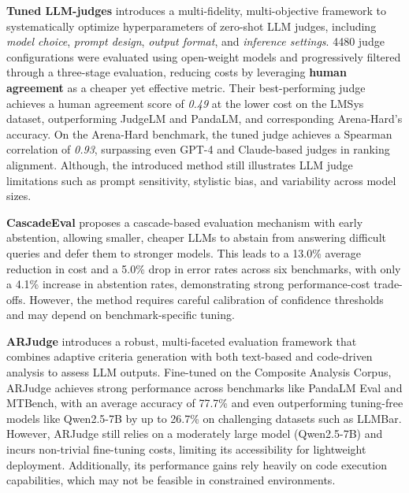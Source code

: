 \documentclass[sigconf, authoryear]{acmart}
\begin{document}
\textbf{Tuned LLM-judges} introduces a multi-fidelity, multi-objective framework to systematically optimize hyperparameters of zero-shot LLM judges, including \textit{model choice}, \textit{prompt design}, \textit{output format}, and \textit{inference settings}.
4480 judge configurations were evaluated using open-weight models and progressively filtered through a three-stage evaluation, reducing costs by leveraging \textbf{human agreement} as a cheaper yet effective metric.
Their best-performing judge achieves a human agreement score of \textit{0.49} at the lower cost on the LMSys dataset, outperforming JudgeLM and PandaLM, and corresponding Arena-Hard’s accuracy.
On the Arena-Hard benchmark, the tuned judge achieves a Spearman correlation of \textit{0.93}, surpassing even GPT-4 and Claude-based judges in ranking alignment.
Although, the introduced method still illustrates LLM judge limitations such as prompt sensitivity, stylistic bias, and variability across model sizes\cite{salinas2025tuningllmjudgedesign}.

\textbf{CascadeEval} proposes a cascade-based evaluation mechanism with early abstention, allowing smaller, cheaper LLMs to abstain from answering difficult queries and defer them to stronger models.
This leads to a 13.0\% average reduction in cost and a 5.0\% drop in error rates across six benchmarks, with only a 4.1\% increase in abstention rates, demonstrating strong performance-cost trade-offs.
However, the method requires careful calibration of confidence thresholds and may depend on benchmark-specific tuning\cite{cascade_eval}.

\textbf{ARJudge} introduces a robust, multi-faceted evaluation framework that combines adaptive criteria generation with both text-based and code-driven analysis to assess LLM outputs.
Fine-tuned on the Composite Analysis Corpus, ARJudge achieves strong performance across benchmarks like PandaLM Eval and MTBench, with an average accuracy of 77.7\% and even outperforming tuning-free models like Qwen2.5-7B by up to 26.7\% on challenging datasets such as LLMBar.
However, ARJudge still relies on a moderately large model (Qwen2.5-7B) and incurs non-trivial fine-tuning costs, limiting its accessibility for lightweight deployment.
Additionally, its performance gains rely heavily on code execution capabilities, which may not be feasible in constrained environments\cite{ar_judge}.
\end{document}
